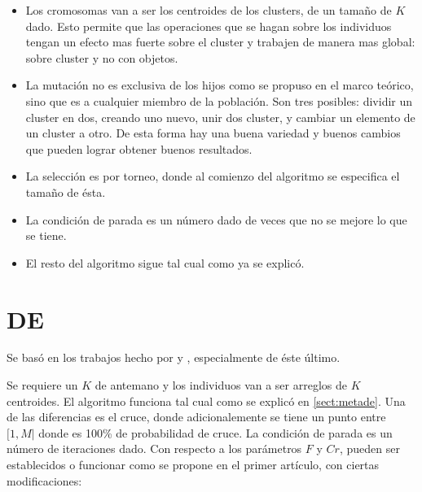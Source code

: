 \begin{itemize}

\item Los cromosomas van a ser los centroides de los clusters, de un tama\~no de $K$
dado. Esto permite que las operaciones que se hagan sobre los individuos tengan
un efecto mas fuerte sobre el cluster y trabajen de manera mas global: sobre cluster y
no con objetos.

\item La mutaci\'on no es exclusiva de los hijos como se propuso en el marco te\'orico,
sino que es a cualquier miembro de la poblaci\'on. Son tres posibles: dividir un cluster
en dos, creando uno nuevo, unir dos cluster, y cambiar un elemento de un cluster a otro.
De esta forma hay una buena variedad y buenos cambios que pueden lograr obtener buenos
resultados.

\item La selecci\'on es por torneo, donde al comienzo del algoritmo se especifica 
el tama\~no de \'esta.

\item La condici\'on de parada es un n\'umero dado de veces que no se mejore lo 
que se tiene.

\item El resto del algoritmo sigue tal cual como ya se explic\'o.

\end{itemize}

\section{DE}  \label{chap:ide}

Se bas\'o en los trabajos hecho por \cite{SwAjAm2008} y \cite{OmEnSa2005}, especialmente
de \'este \'ultimo.

Se requiere un $K$ de antemano y los individuos van a ser arreglos de $K$ centroides.
El algoritmo funciona tal cual como se explic\'o en \ref{sect:metade}. Una de las diferencias es
el cruce, donde adicionalemente se tiene
un punto entre $[1,M|$ donde es 100\% de probabilidad de cruce. La condici\'on
de parada es un n\'umero de iteraciones dado. Con respecto
a los par\'ametros $F$ y $Cr$, pueden ser establecidos o funcionar como se propone
en el primer art\'iculo, con ciertas modificaciones:

